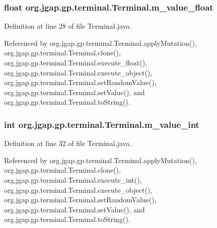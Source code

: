 \hypertarget{classorg_1_1jgap_1_1gp_1_1terminal_1_1_terminal_a99b2ee9efce4331568ae6d3c8b71da24}{
\subsubsection[{m\-\_\-value\-\_\-float}]{\setlength{\rightskip}{0pt plus 5cm}float org.\-jgap.\-gp.\-terminal.\-Terminal.\-m\-\_\-value\-\_\-float\hspace{0.3cm}{\ttfamily [private]}}}\label{classorg_1_1jgap_1_1gp_1_1terminal_1_1_terminal_a99b2ee9efce4331568ae6d3c8b71da24}


Definition at line 28 of file Terminal.\-java.



Referenced by org.\-jgap.\-gp.\-terminal.\-Terminal.\-apply\-Mutation(), org.\-jgap.\-gp.\-terminal.\-Terminal.\-clone(), org.\-jgap.\-gp.\-terminal.\-Terminal.\-execute\-\_\-float(), org.\-jgap.\-gp.\-terminal.\-Terminal.\-execute\-\_\-object(), org.\-jgap.\-gp.\-terminal.\-Terminal.\-set\-Random\-Value(), org.\-jgap.\-gp.\-terminal.\-Terminal.\-set\-Value(), and org.\-jgap.\-gp.\-terminal.\-Terminal.\-to\-String().

\hypertarget{classorg_1_1jgap_1_1gp_1_1terminal_1_1_terminal_a8bffe6ee323e915c336df2da5dd6d769}{
\subsubsection[{m\-\_\-value\-\_\-int}]{\setlength{\rightskip}{0pt plus 5cm}int org.\-jgap.\-gp.\-terminal.\-Terminal.\-m\-\_\-value\-\_\-int\hspace{0.3cm}{\ttfamily [private]}}}\label{classorg_1_1jgap_1_1gp_1_1terminal_1_1_terminal_a8bffe6ee323e915c336df2da5dd6d769}


Definition at line 32 of file Terminal.\-java.



Referenced by org.\-jgap.\-gp.\-terminal.\-Terminal.\-apply\-Mutation(), org.\-jgap.\-gp.\-terminal.\-Terminal.\-clone(), org.\-jgap.\-gp.\-terminal.\-Terminal.\-execute\-\_\-int(), org.\-jgap.\-gp.\-terminal.\-Terminal.\-execute\-\_\-object(), org.\-jgap.\-gp.\-terminal.\-Terminal.\-set\-Random\-Value(), org.\-jgap.\-gp.\-terminal.\-Terminal.\-set\-Value(), and org.\-jgap.\-gp.\-terminal.\-Terminal.\-to\-String().

